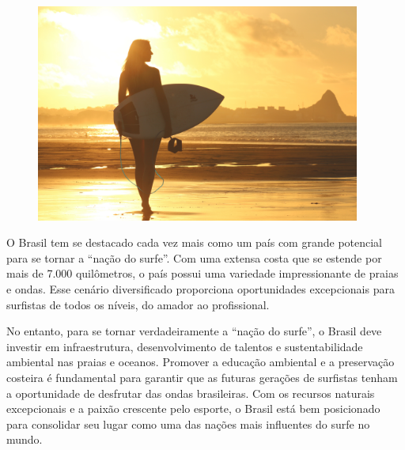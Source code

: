 \begin{myquote}




\begin{figure}[H]
\centering
\includegraphics[width=0.95\textwidth]{./imgSAEB_7_POR/media/image77.png}
\end{figure} 

O Brasil tem se destacado cada vez mais como um país com grande potencial para
se tornar a ``nação do surfe''. Com uma extensa costa que se estende por mais de
7.000 quilômetros, o país possui uma variedade impressionante de praias e
ondas. Esse cenário diversificado proporciona oportunidades excepcionais para
surfistas de todos os níveis, do amador ao profissional. 

No entanto, para se tornar verdadeiramente a ``nação do surfe'', o Brasil deve
investir em infraestrutura, desenvolvimento de talentos e
sustentabilidade ambiental nas praias e oceanos. Promover a educação ambiental
e a preservação costeira é fundamental para garantir que as futuras gerações
de surfistas tenham a oportunidade de desfrutar das ondas brasileiras. Com os
recursos naturais excepcionais e a paixão crescente pelo esporte, o Brasil
está bem posicionado para consolidar seu lugar como uma das nações mais
influentes do surfe no mundo.

\end{myquote}

